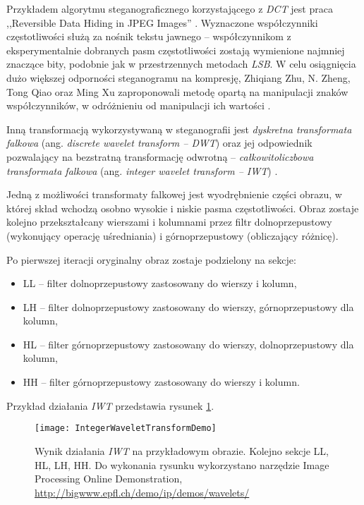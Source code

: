 {{{            %
            Przykładem algorytmu steganograficznego korzystającego z \textit{DCT} jest praca ,,Reversible Data
            Hiding in JPEG Images'' \cite{Huang2016ReversibleDH, Li2007ASM}. Wyznaczone współczynniki częstotliwości
            służą za nośnik tekstu jawnego -- współczynnikom z eksperymentalnie dobranych pasm częstotliwości zostają
            wymienione najmniej znaczące bity, podobnie jak w przestrzennych metodach \textit{LSB}. W celu osiągnięcia
            dużo większej odporności steganogramu na kompresję, Zhiqiang Zhu, N. Zheng, Tong Qiao oraz Ming Xu
            zaproponowali metodę opartą na manipulacji znaków współczynników, w odróżnieniu od manipulacji ich
            wartości \cite{Zhu2019RobustSB}.

            Inną transformacją wykorzystywaną w steganografii jest \textit{dyskretna transformata falkowa} (ang.
            \textit{discrete wavelet transform -- DWT}) oraz jej odpowiednik pozwalający na bezstratną transformację
            odwrotną -- \textit{całkowitoliczbowa transformata falkowa} (ang. \textit{integer wavelet transform --
            IWT}) \cite{Xuan2005LosslessDH}.

            Jedną z możliwości transformaty falkowej jest wyodrębnienie części obrazu, w której skład wchodzą osobno
            wysokie i niskie pasma częstotliwości. Obraz zostaje kolejno przekształcany wierszami i kolumnami przez
            filtr dolnoprzepustowy (wykonujący operację uśredniania) i górnoprzepustowy (obliczający różnicę).

            Po pierwszej iteracji oryginalny obraz zostaje podzielony na sekcje:
            \begin{itemize}
                \item LL -- filter dolnoprzepustowy zastosowany do wierszy i kolumn,
                \item LH -- filter dolnoprzepustowy zastosowany do wierszy, górnoprzepustowy dla kolumn,
                \item HL -- filter górnoprzepustowy zastosowany do wierszy, dolnoprzepustowy dla kolumn,
                \item HH -- filter górnoprzepustowy zastosowany do wierszy i kolumn.
            \end{itemize}

            Przykład działania \textit{IWT} przedstawia rysunek \ref{fig:iwtdemo}.

            \begin{figure}
                \centering
                \texttt{[image: IntegerWaveletTransformDemo]}
                \caption{Wynik działania \textit{IWT} na przykładowym obrazie. Kolejno sekcje LL, HL, LH, HH. Do wykonania
                    rysunku wykorzystano narzędzie Image Processing Online Demonstration, \url{http://bigwww.epfl.ch/demo/ip/demos/wavelets/}}
                \label{fig:iwtdemo}
            \end{figure}


}}}
